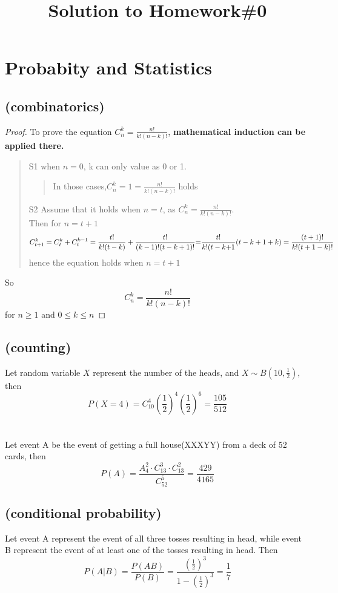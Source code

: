 \documentclass[8pt,a4paper]{exam}
\title{Solution to Homework\#0}
\date{}
\begin{document}
	\maketitle
	\section{Probabity and Statistics}
	  \subsection{(combinatorics)}
	  \begin{proof}
	  To prove the equation  $C_n^k = \frac{{n!}}{{k!(n - k)!}}$, \textbf{mathematical induction can be applied there.}
	     \begin{quote}  
	      S1 when $n=0$, k can only value as 0 or 1.  
	        \begin{quote}
	     	In those cases,$C_n^k = 1 = \frac{{n!}}{{k!(n - k)!}}$ holds
	        \end{quote}
	      S2 Assume that it holds when $n=t$, as $C_n^k = \frac{{n!}}{{k!(n - k)!}}$. \\
          Then for $n=t+1$\\
           \[C_{t + 1}^k = C_t^k + C_t^{k - 1} = \frac{{t!}}{{k!(t - k)}} + \frac{{t!}}{{(k - 1)!(t - k + 1)!}}{\rm{ = }}\frac{{t!}}{{k!(t - k{\rm{ + }}1}}(t - k + 1 + k) = \frac{{(t + 1)!}}{{k!(t + 1 - k)!}}\]
           hence the equation holds when $n=t+1$  
        \end{quote}
     So\\ 
     \[C_n^k = \frac{{n!}}{{k!(n - k)!}}\]for $n \ge 1$ and $0 \le k \le n$     
      \end{proof}
	  \subsection{(counting)}
	   Let random variable $X$ represent the number of the heads, and $X\sim B(10,\frac{1}{2})$, then 
       \[P(X = 4) = C_{10}^4{(\frac{1}{2})^4}{(\frac{1}{2})^6} = \frac{{105}}{{512}}\]
       \\ \\
       \indent Let event A be the event of getting a full house(XXXYY) from a deck of 52 cards, then
       \[P(A) = \frac{{A_4^2 \cdot C_{13}^3 \cdot C_{13}^2}}{{C_{52}^5}} = \frac{{429}}{{4165}}\]

	  \subsection{(conditional probability)}
	  Let event A represent the event of all three tosses resulting in head, while event B represent the event of at least one of the tosses resulting in head. Then
      \[P(A|B) = \frac{{P(AB)}}{{P(B)}} = \frac{{{{(\frac{1}{2})}^3}}}{{1 - {{(\frac{1}{2})}^3}}} = \frac{1}{7}\]
	  
\end{document}

